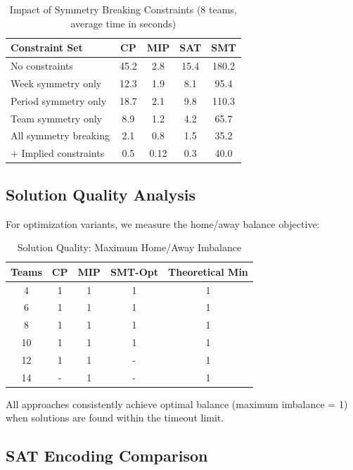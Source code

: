 \documentclass[11pt]{article}
\begin{document}
\begin{itemize}
\begin{table}[H]
\centering
\caption{Impact of Symmetry Breaking Constraints (8 teams, average time in seconds)}
\label{tab:constraints}
\begin{tabular}{@{}lcccc@{}}
\toprule
\textbf{Constraint Set} & \textbf{CP} & \textbf{MIP} & \textbf{SAT} & \textbf{SMT} \\
\midrule
No constraints          & 45.2 & 2.8  & 15.4 & 180.2 \\
Week symmetry only      & 12.3 & 1.9  & 8.1  & 95.4  \\
Period symmetry only    & 18.7 & 2.1  & 9.8  & 110.3 \\
Team symmetry only      & 8.9  & 1.2  & 4.2  & 65.7  \\
All symmetry breaking   & 2.1  & 0.8  & 1.5  & 35.2  \\
+ Implied constraints   & 0.5  & 0.12 & 0.3  & 40.0  \\
\bottomrule
\end{tabular}
\end{table}

\subsection{Solution Quality Analysis}

For optimization variants, we measure the home/away balance objective:

\begin{table}[H]
\centering
\caption{Solution Quality: Maximum Home/Away Imbalance}
\label{tab:quality}
\begin{tabular}{@{}ccccc@{}}
\toprule
\textbf{Teams} & \textbf{CP} & \textbf{MIP} & \textbf{SMT-Opt} & \textbf{Theoretical Min} \\
\midrule
4  & 1 & 1 & 1 & 1 \\
6  & 1 & 1 & 1 & 1 \\
8  & 1 & 1 & 1 & 1 \\
10 & 1 & 1 & 1 & 1 \\
12 & 1 & 1 & - & 1 \\
14 & - & 1 & - & 1 \\
\bottomrule
\end{tabular}
\end{table}

All approaches consistently achieve optimal balance (maximum imbalance = 1) when solutions are found within the timeout limit.

\subsection{SAT Encoding Comparison}


\end{itemize}
\end{document}
